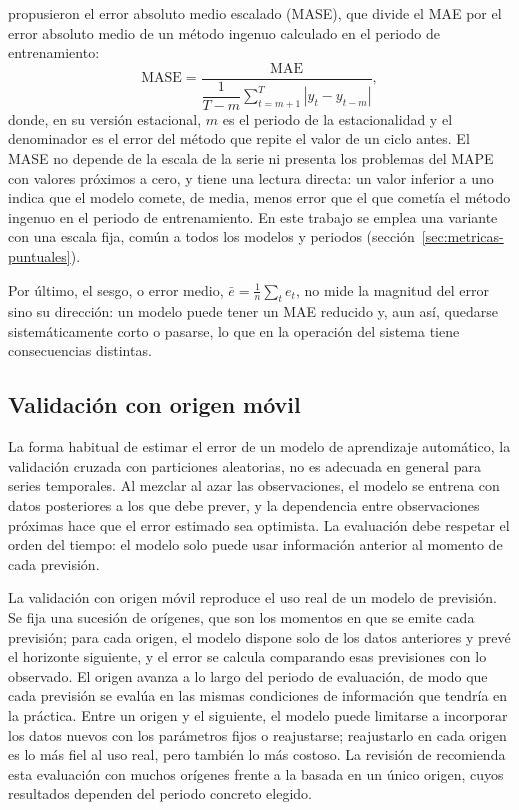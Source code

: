 \textcite{hyndman2006another} propusieron el error absoluto medio escalado
(MASE), que divide el MAE por el error absoluto medio de un método ingenuo
calculado en el periodo de entrenamiento:
\begin{equation}
	\mathrm{MASE} = \frac{\mathrm{MAE}}{\dfrac{1}{T-m}\sum_{t=m+1}^{T} |y_t - y_{t-m}|},
\end{equation}
donde, en su versión estacional, $m$ es el periodo de la estacionalidad y el
denominador es el error del método que repite el valor de un ciclo antes.
El MASE no depende de la escala de la serie ni presenta los problemas del
MAPE con valores próximos a cero, y tiene una lectura directa: un valor
inferior a uno indica que el modelo comete, de media, menos error que el
que cometía el método ingenuo en el periodo de entrenamiento. En este
trabajo se emplea una variante con una escala fija, común a todos los
modelos y periodos (sección~\ref{sec:metricas-puntuales}).

Por último, el sesgo, o error medio, $\bar{e} = \frac{1}{n}\sum_t e_t$, no
mide la magnitud del error sino su dirección: un modelo puede tener un MAE
reducido y, aun así, quedarse sistemáticamente corto o pasarse, lo que en la
operación del sistema tiene consecuencias distintas.

\subsection{Validación con origen móvil}\label{sec:origen-movil}

La forma habitual de estimar el error de un modelo de aprendizaje automático,
la validación cruzada con particiones aleatorias, no es adecuada en general
para series temporales. Al mezclar al azar las observaciones, el modelo se entrena con
datos posteriores a los que debe prever, y la dependencia entre
observaciones próximas hace que el error estimado sea optimista. La
evaluación debe respetar el orden del tiempo: el modelo solo puede usar
información anterior al momento de cada previsión.

La validación con origen móvil \parencite{tashman2000outofsample,hyndman2021fpp3}
reproduce el uso real de un modelo de previsión. Se fija una sucesión de
orígenes, que son los momentos en que se emite cada previsión; para cada
origen, el modelo dispone solo de los datos anteriores y prevé el horizonte
siguiente, y el error se calcula comparando esas previsiones con lo
observado. El origen avanza a lo largo del periodo de evaluación, de modo
que cada previsión se evalúa en las mismas condiciones de información que
tendría en la práctica. Entre un origen y el siguiente, el modelo puede
limitarse a incorporar los datos nuevos con los parámetros fijos o
reajustarse; reajustarlo en cada origen es lo más fiel al uso real, pero
también lo más costoso. La revisión de \textcite{tashman2000outofsample}
recomienda esta evaluación con muchos orígenes frente a la basada en un
único origen, cuyos resultados dependen del periodo concreto elegido.


